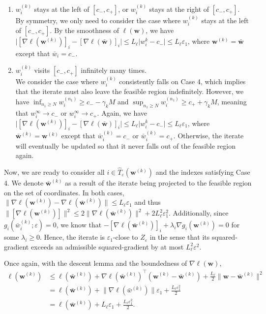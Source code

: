 \documentclass[10pt,a4paper]{article}
\begin{document}
\begin{enumerate}[label=Case 4(\alph*), leftmargin=2.5cm]
  \item $w_i^{(k)}$ stays at the left of $[c_-, c_+]$, or $w_i^{(k)}$ stays at the right of $[c_-, c_+]$. \\By symmetry, we only need to consider the case where $w_i^{(k)}$ stays at the left of $[c_-, c_+]$. By the smoothness of $\ell(\mathbf{w})$, we have $\lvert [\nabla \ell(\mathbf{w}^{(k)})]_i- [\nabla \ell(\bar{\mathbf{w}})]_i\rvert\leq L_\ell \lvert w^{k}_i-c_-\rvert\leq L_\ell\varepsilon_1$, where $\mathbf{w}^{(k)}=\bar{\mathbf{w}}$ except that $\bar{w}_i=c_-$.
  \item $w_i^{(k)}$ visits $[c_-, c_+]$ infinitely many times. \\We consider the case where $w_i^{(k)}$ consistently falls on Case 4, which implies that the iterate must also leave the feasible region indefinitely. However, we have $\inf_{n_1\geq N} w_i^{(n_1)}\geq c_--\gamma_kM$ and  $\sup_{n_1\geq N} w_i^{(n_1)}\geq c_++\gamma_kM$, meaning that $w_i^{\infty}\to c_-$ or $w_i^{\infty}\to c_+$. Again, we have $\lvert [\nabla \ell(\mathbf{w}^{(k)})]_i- [\nabla \ell(\bar{\mathbf{w}})]_i\rvert\leq L_\ell \lvert w^{k}_i-c_-\rvert\leq L_\ell\varepsilon_1$, where $\bar{\mathbf{w}}^{(k)}=\mathbf{w}^{(k)}$ except that $\bar{w}^{(k)}_i=c_-$ or $\bar{w}^{(k)}_i=c_+$. Otherwise, the iterate will eventually be updated so that it never falls out of the feasible region again.
\end{enumerate}

Now, we are ready to consider all $i\in \hat{T}_\varepsilon(\mathbf{w}^{(k)})$ and the indexes satisfying Case 4. We denote $\bar{\mathbf{w}}^{(k)}$ as a result of the iterate being projected to the feasible region on the set of coordinates.
In both cases, $\lVert \nabla\ell(\mathbf{w}^{(k)}) - \nabla\ell(\bar{\mathbf{w}}^{(k)})\rVert\leq L_\ell\varepsilon_1$ and thus $\lVert[\nabla\ell(\mathbf{w}^{(k)})]\rVert^2 \leq  2 \lVert\nabla\ell(\bar{\mathbf{w}}^{(k)})\rVert^2 + 2L_\ell^2\varepsilon_1^2$. Additionally, since $g_i(\bar{w}^{(k)}_i;\varepsilon)=0$, we know that $-[\nabla\ell(\bar{\mathbf{w}}^{(k)})]_i+\lambda_i\nabla g_i(\mathbf{w}^{(k)})=0$ for some $\lambda_i\geq 0$. Hence, the iterate is $\varepsilon_1$-close to $Z_\varepsilon$ in the sense that its squared-gradient exceeds an admissible squared-gradient by at most $L_\ell^2\varepsilon^2$.

Once again, with the descent lemma and the boundedness of $\nabla \ell(\mathbf{w})$, $$\begin{aligned}
    \ell(\mathbf{w}^{(k)}) & \leq \ell (\bar{\mathbf{w}}^{(k)})+\nabla\ell(\mathbf{\bar{w}}^{(k)})^\top(\mathbf{w}^{(k)}-\mathbf{\bar{w}}^{(k)})+\frac{L_\ell}{2}\lVert\mathbf{w}-\mathbf{\bar{w}}^{(k)}\rVert^2 \\
                           & =\ell (\bar{\mathbf{w}}^{(k)})+\lVert \nabla\ell(\bar{w}^{(k)}) \rVert\varepsilon_1+\frac{L_\ell\varepsilon_1^2}{2}                                                                 \\
                           & =\ell (\bar{\mathbf{w}}^{(k)})+L_\ell\varepsilon_1+\frac{L_\ell\varepsilon_1^2}{2}.
  \end{aligned}$$
\end{document}
